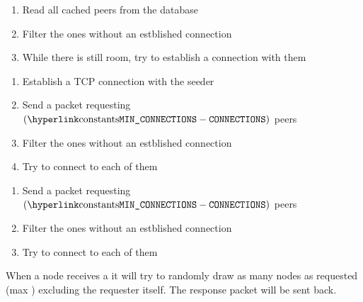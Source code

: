 \documentclass[../documentation.tex]{subfiles}
\begin{document}

\begin{center}
\end{center}

\begin{enumerate}
    \item Read all cached peers from the database
    \item Filter the ones without an estblished connection
    \item While there is still room, try to establish a connection with them
\end{enumerate}

\begin{enumerate}
    \item Establish a TCP connection with the seeder
    \item Send a  packet requesting
        \((\text{\const{MIN\_CONNECTIONS}} - \text{\texttt{CONNECTIONS}})\) peers
    \item Filter the ones without an estblished connection
    \item Try to connect to each of them
\end{enumerate}

\begin{enumerate}
    \item Send a  packet requesting
        \((\text{\const{MIN\_CONNECTIONS}} - \text{\texttt{CONNECTIONS}})\) peers
    \item Filter the ones without an estblished connection
    \item Try to connect to each of them
\end{enumerate}

When a node receives a 
it will try to randomly draw as many nodes as requested (max
) excluding the requester itself.
The  response packet will be sent back.
\end{document}
